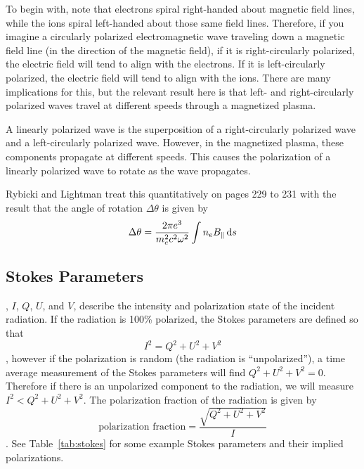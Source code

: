 To begin with, note that electrons spiral right-handed about
magnetic field lines, while the ions spiral left-handed about those same field lines.
Therefore, if you imagine a circularly polarized electromagnetic wave traveling down a
magnetic field line (in the direction of the magnetic field), if it is right-circularly polarized,
the electric field will tend to align with the electrons.  If it is left-circularly polarized,
the electric field will tend to align with the ions.  There are many implications for this,
but the relevant result here is that left- and right-circularly polarized waves travel at
different speeds through a magnetized plasma.

A linearly polarized wave is the superposition of a right-circularly polarized wave and a
left-circularly polarized wave.  However, in the magnetized plasma, these components propagate
at different speeds.  This causes the polarization of a linearly polarized wave to rotate as
the wave propagates.

Rybicki and Lightman treat this quantitatively on pages 229 to 231 with the result that the
angle of rotation $\Delta\theta$ is given by
\begin{dmath}
    \Delta\theta=\frac{2\pi e^3}{m_e^2c^2\omega^2}\int n_e B_\parallel\,\d s
\end{dmath}

\subsection{Stokes Parameters}
, $I$, $Q$, $U$, and $V$, describe the intensity and
polarization state of the incident radiation.
If the radiation is 100\% polarized, the Stokes parameters are defined so that
\begin{dmath}
    I^2 = Q^2 + U^2 + V^2
\end{dmath},
however if the polarization is random (the radiation is ``unpolarized''), a time average
measurement of the Stokes parameters will find $Q^2+U^2+V^2=0$.  Therefore if there
is an unpolarized component to the radiation, we will measure $I^2 < Q^2 + U^2 + V^2$.
The polarization fraction of the radiation is given by
\begin{dmath}
    \text{polarization fraction} = \frac{\sqrt{Q^2+U^2+V^2}}{I}
\end{dmath}.
See Table~\ref{tab:stokes} for some example Stokes parameters and their implied
polarizations.

